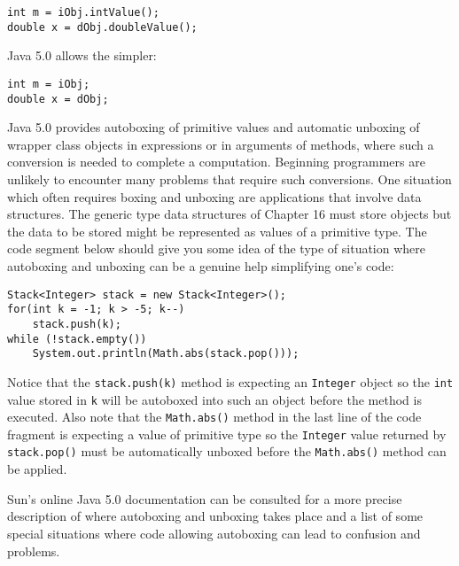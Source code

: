 \begin{jjjlisting}
\begin{lstlisting}
int m = iObj.intValue();
double x = dObj.doubleValue();
\end{lstlisting}
\end{jjjlisting}

\noindent Java 5.0 allows the simpler:

\begin{jjjlisting}
\begin{lstlisting}
int m = iObj;
double x = dObj;
\end{lstlisting}
\end{jjjlisting}

Java 5.0 provides autoboxing of primitive values and automatic unboxing of wrapper 
class objects in expressions or in arguments of methods, where such a conversion
is needed to complete a computation.  Beginning programmers are unlikely to
encounter many problems that require such conversions.  One situation which often
requires boxing and unboxing are applications that involve data structures.  The 
generic type data structures of Chapter 16 must store objects but the data to
be stored might be represented as values of a primitive type.  The code segment
below should give you some idea of the type of situation where autoboxing and 
unboxing can be a genuine help simplifying one's code: 
 
\begin{jjjlisting}
\begin{lstlisting}
Stack<Integer> stack = new Stack<Integer>();
for(int k = -1; k > -5; k--)
    stack.push(k);
while (!stack.empty())
    System.out.println(Math.abs(stack.pop()));
\end{lstlisting}
\end{jjjlisting}

\noindent  Notice that the {\tt stack.push(k)} method is expecting an
{\tt Integer} object so the {\tt int} value stored in {\tt k} will be
autoboxed into such an object before the method is executed.  Also note that
the {\tt Math.abs()} method in the last line of the code fragment is
expecting a value of primitive type so the {\tt  Integer} value returned
by {\tt stack.pop()} must be automatically unboxed before the {\tt Math.abs()} 
method can be applied.

Sun's online Java 5.0 documentation can be consulted for a more precise description 
of where autoboxing and unboxing takes place and a list of some special situations 
where code allowing autoboxing can lead to confusion and problems.

